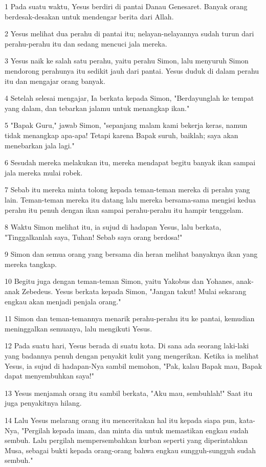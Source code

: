 \par 1 Pada suatu waktu, Yesus berdiri di pantai Danau Genesaret. Banyak orang berdesak-desakan untuk mendengar berita dari Allah.
\par 2 Yesus melihat dua perahu di pantai itu; nelayan-nelayannya sudah turun dari perahu-perahu itu dan sedang mencuci jala mereka.
\par 3 Yesus naik ke salah satu perahu, yaitu perahu Simon, lalu menyuruh Simon mendorong perahunya itu sedikit jauh dari pantai. Yesus duduk di dalam perahu itu dan mengajar orang banyak.
\par 4 Setelah selesai mengajar, Ia berkata kepada Simon, "Berdayunglah ke tempat yang dalam, dan tebarkan jalamu untuk menangkap ikan."
\par 5 "Bapak Guru," jawab Simon, "sepanjang malam kami bekerja keras, namun tidak menangkap apa-apa! Tetapi karena Bapak suruh, baiklah; saya akan menebarkan jala lagi."
\par 6 Sesudah mereka melakukan itu, mereka mendapat begitu banyak ikan sampai jala mereka mulai robek.
\par 7 Sebab itu mereka minta tolong kepada teman-teman mereka di perahu yang lain. Teman-teman mereka itu datang lalu mereka bersama-sama mengisi kedua perahu itu penuh dengan ikan sampai perahu-perahu itu hampir tenggelam.
\par 8 Waktu Simon melihat itu, ia sujud di hadapan Yesus, lalu berkata, "Tinggalkanlah saya, Tuhan! Sebab saya orang berdosa!"
\par 9 Simon dan semua orang yang bersama dia heran melihat banyaknya ikan yang mereka tangkap.
\par 10 Begitu juga dengan teman-teman Simon, yaitu Yakobus dan Yohanes, anak-anak Zebedeus. Yesus berkata kepada Simon, "Jangan takut! Mulai sekarang engkau akan menjadi penjala orang."
\par 11 Simon dan teman-temannya menarik perahu-perahu itu ke pantai, kemudian meninggalkan semuanya, lalu mengikuti Yesus.
\par 12 Pada suatu hari, Yesus berada di suatu kota. Di sana ada seorang laki-laki yang badannya penuh dengan penyakit kulit yang mengerikan. Ketika ia melihat Yesus, ia sujud di hadapan-Nya sambil memohon, "Pak, kalau Bapak mau, Bapak dapat menyembuhkan saya!"
\par 13 Yesus menjamah orang itu sambil berkata, "Aku mau, sembuhlah!" Saat itu juga penyakitnya hilang.
\par 14 Lalu Yesus melarang orang itu menceritakan hal itu kepada siapa pun, kata-Nya, "Pergilah kepada imam, dan minta dia untuk memastikan engkau sudah sembuh. Lalu pergilah mempersembahkan kurban seperti yang diperintahkan Musa, sebagai bukti kepada orang-orang bahwa engkau sungguh-sungguh sudah sembuh."
